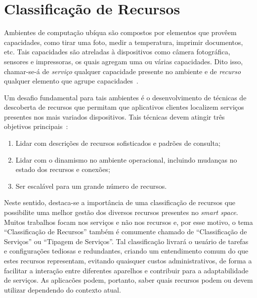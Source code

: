 \chapter{Classificação de Recursos}
\label{cap:classificacao}

Ambientes de computação ubíqua são compostos por elementos que provêem capacidades, como tirar uma foto, medir a temperatura, imprimir documentos, etc. Tais capacidades são atreladas à dispositivos como câmera fotográfica, sensores e impressoras, os quais agregam uma ou várias capacidades. Dito isso, chamar-se-á de \emph{serviço} qualquer capacidade presente no ambiente e de \emph{recurso} qualquer elemento que agrupe capacidades~\cite{gomes2007}.

Um desafio fundamental para tais ambientes é o desenvolvimento de técnicas de descoberta de recursos que permitam que aplicativos clientes localizem serviços presentes nos mais variados dispositivos. Tais técnicas devem atingir três objetivos principais~\cite{balazinska2002ins/twine}:

\begin{enumerate}
	\item Lidar com descrições de recursos sofisticados e padrões de consulta;
	\item Lidar com o dinamismo no ambiente operacional, incluindo mudanças no estado dos recursos e conexões;
	\item Ser escalável para um grande número de recursos.
\end{enumerate}

Neste sentido, destaca-se a importância de uma classificação de recursos que possibilite uma melhor gestão dos diversos recursos presentes no \emph{smart space}. Muitos trabalhos focam nos serviços e não nos recursos e, por esse motivo, o tema ``Classificação de Recursos'' também é comumente chamado de ``Classificação de Serviços'' ou ``Tipagem de Serviços''. Tal classificação livrará o usuário de tarefas e configurações tediosas e redundantes, criando um entendimento comum do que estes recursos representam, evitando quaisquer custos administrativos, de forma a facilitar a interação entre diferentes aparelhos e contribuir para a adaptabilidade de serviços. As aplicacões podem, portanto, saber quais recursos podem ou devem utilizar dependendo do contexto atual.

